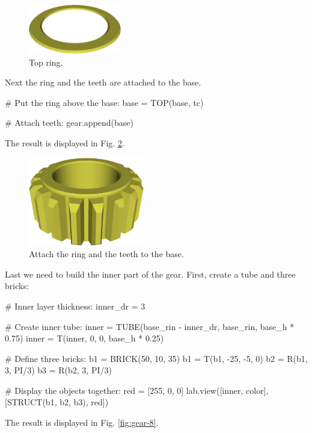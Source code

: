 \begin{figure}[!ht]
\begin{center}
\includegraphics[width=0.36\textwidth]{img/gear-5.png}
\end{center}
\vspace{-4mm}
\caption{Top ring.}
\label{fig:gear-5}
\end{figure}

\noindent
Next the ring and the teeth are attached to the base.

{\small
\begin{bluecode}
# Put the ring above the base:
base = TOP(base, tc)

# Attach teeth:
gear.append(base) 
\end{bluecode}
}
\noindent
The result is displayed in Fig. \ref{fig:gear-7}.

\begin{figure}[!ht]
\begin{center}
\includegraphics[width=0.45\textwidth]{img/gear-7.png}
\end{center}
\vspace{-4mm}
\caption{Attach the ring and the teeth to the base.}
\label{fig:gear-7}
\end{figure}
\noindent
Last we need to build the inner part of the gear. 
First, create a tube and three bricks:

{\small
\begin{bluecode}
# Inner layer thickness:
inner_dr  = 3

# Create inner tube:
inner = TUBE(base_rin - inner_dr, base_rin, base_h * 0.75)
inner = T(inner, 0, 0, base_h * 0.25)

# Define three bricks:
b1 = BRICK(50, 10, 35)
b1 = T(b1, -25, -5, 0)
b2 = R(b1, 3, PI/3)
b3 = R(b2, 3, PI/3)

# Display the objects together:
red = [255, 0, 0]
lab.view([inner, color], [STRUCT(b1, b2, b3), red])
\end{bluecode}
}
\noindent
The result is displayed in Fig. \ref{fig:gear-8}.

